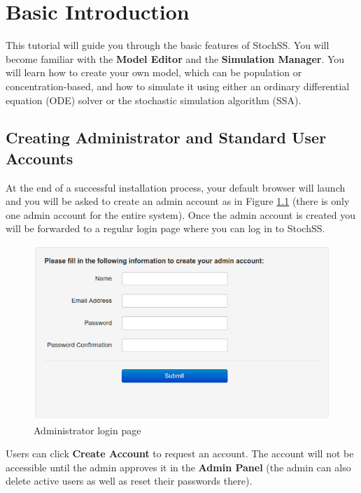\chapter{Basic Introduction}
\label{chapter1}
This tutorial will guide you through the basic features of StochSS. You will become familiar with the \textbf{Model Editor} and the \textbf{Simulation Manager}. You will learn how to create your own model, which can be population or concentration-based, and how to simulate it using either an ordinary differential equation (ODE) solver or the stochastic simulation algorithm (SSA).

\section{Creating Administrator and Standard User Accounts}
At the end of a successful installation process, your default browser will launch and you will be asked to create an admin account as in Figure \ref{fig:admin} (there is only one admin account for the entire system).
Once the admin account is created you will be forwarded to a regular login page where you can log in to StochSS.

\begin{figure}[!htb]
\centering
\includegraphics[scale=0.64]{T1/admin.png}
\caption{Administrator login page}
\label{fig:admin}
\end{figure}

Users can click \textbf{Create Account} to request an account.
The account will not be accessible until the admin approves it in the \textbf{Admin Panel} (the admin can also delete active users as well as reset their passwords there).
%

